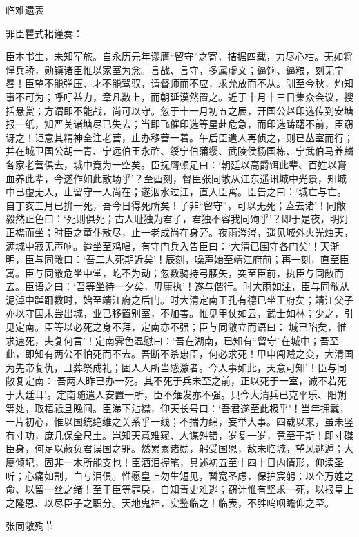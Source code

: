 \documentclass[]{article}
\begin{document}
临难遗表

罪臣瞿式耜谨奏：

臣本书生，未知军旅。自永历元年谬膺``留守''之寄，拮据四载，力尽心枯。无如将悍兵骄，勋镇诸臣惟以家室为念。言战、言守，多属虚文；逼饷、逼粮，刻无宁晷！臣望不能弹压、才不能驾驭，请督师而不应，求允放而不从。驯至今秋，灼知事不可为；呼吁益力，章凡数上，而朝延漠然置之。近于十月十三日集众会议，搜括悬赏；方谓即不能战，尚可以守。忽于十一月初五之辰，开国公赵印选传到安塘报一纸，知严关诸塘尽已失去；当即飞催印选等星赴危急，而印选踌躇不前，臣窃讶之！讵意其精神全注老营，止办移营一着。午后臣遣人再侦之，则已丛室而行；并在城卫国公胡一青、宁远伯王永祚、绥宁伯蒲缨、武陵侯杨国栋、宁武伯马养麟各家老营俱去，城中竟为一空矣。臣抚膺顿足曰：`朝廷以高爵饵此辈、百姓以膏血养此辈，今遂作如此散场乎'？至酉刻，督臣张同敞从江东遥讯城中光景，知城中已虚无人，止留守一人尚在；遂泅水过江，直入臣寓。臣告之曰：`城亡与亡。自丁亥三月已拚一死，吾今日得死所矣！子非``留守''，可以无死；盍去诸'！同敞毅然正色曰：`死则俱死；古人耻独为君子，君独不容我同殉乎'？即于是夜，明灯正襟而坐；时臣之童仆散尽，止一老成尚在身旁。夜雨涔涔，遥见城外火光烛天，满城中寂无声响。迨坐至鸡唱，有守门兵入告臣曰：`大清已围守各门矣'！天渐明，臣与同敞曰：`吾二人死期近矣'！辰刻，噪声始至靖江府前；再一刻，直至臣寓。臣与同敞危坐中堂，屹不为动；忽数骑持弓腰矢，突至臣前，执臣与同敞而去。臣语之曰：`吾等坐待一夕矣，毋庸执'！遂与偕行。时大雨如注，臣与同敞从泥淖中踔跚数时，始至靖江府之后门。时大清定南王孔有德已坐王府矣；靖江父子亦以守国未尝出城，业已移置别室，不加害。惟见甲仗如云，武士如林；少之，引见定南。臣等以必死之身不拜，定南亦不强；臣与同敞立而语曰：`城已陷矣，惟求速死，夫复何言'！定南霁色温慰曰：`吾在湖南，已知有``留守''在城中；吾至此，即知有两公不怕死而不去。吾断不杀忠臣，何必求死！甲申闯贼之变，大清国为先帝复仇，且葬祭成礼；固人人所当感激者。今人事如此，天意可知'！臣与同敞复定南：`吾两人昨已办一死。其不死于兵未至之前，正以死于一室，诚不若死于大廷耳'。定南随遣人安置一所，臣不薙发亦不强。只今大清兵已克平乐、阳朔等处，取梧祗旦晚间。臣涕下沾襟，仰天长号曰：`吾君遂至此极乎'！当年拥戴，一片初心，惟以国统绝维之关系乎一线；不揣力绵，妄举大事。四载以来，虽未竖有寸功，庶几保全尺土。岂知天意难窥、人谋舛错，岁复一岁，竟至于斯！即寸磔臣身，何足以蔽负君误国之罪。然累累诸勋，躬受国恩，敌未临城，望风逃遁；大厦倾圮，固非一木所能支也！臣洒泪握笔，具述初五至十四十日内情形，仰渎圣听；心痛如割，血与泪俱。惟愿皇上勿生短见，暂宽圣虑，保护宸躬；以全万姓之命、以留一丝之绪！至于臣等罪戾，自知青史难逃；窃计惟有坚求一死，以报皇上之隆恩、以尽臣子之职分。天地鬼神，实鉴临之！临表，不胜呜咽瞻仰之至。

张同敞殉节
\end{document}
